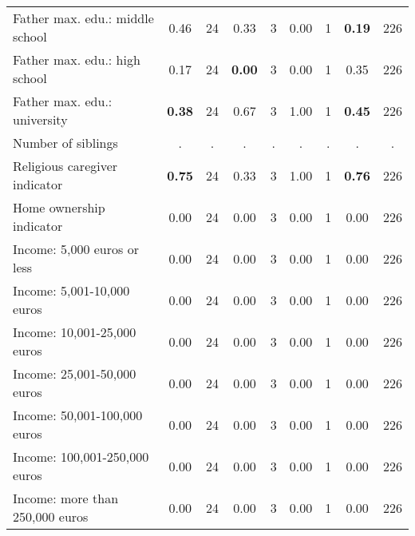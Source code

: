 \begin{tabular}{l c c c c c c c c}
Father max. edu.: middle school &      0.46 &        24 &      0.33 &         3 &      0.00 &         1 & \textbf{     0.19} &       226 \\
Father max. edu.: high school &      0.17 &        24 & \textbf{     0.00} &         3 &      0.00 &         1 &      0.35 &       226 \\
Father max. edu.: university & \textbf{     0.38} &        24 &      0.67 &         3 &      1.00 &         1 & \textbf{     0.45} &       226 \\
Number of siblings &         . & . &         . & . &         . & . &         . & . \\
Religious caregiver indicator & \textbf{     0.75} &        24 &      0.33 &         3 &      1.00 &         1 & \textbf{     0.76} &       226 \\
Home ownership indicator &      0.00 &        24 &      0.00 &         3 &      0.00 &         1 &      0.00 &       226 \\
Income: 5,000 euros or less &      0.00 &        24 &      0.00 &         3 &      0.00 &         1 &      0.00 &       226 \\
Income: 5,001-10,000 euros &      0.00 &        24 &      0.00 &         3 &      0.00 &         1 &      0.00 &       226 \\
Income: 10,001-25,000 euros &      0.00 &        24 &      0.00 &         3 &      0.00 &         1 &      0.00 &       226 \\
Income: 25,001-50,000 euros &      0.00 &        24 &      0.00 &         3 &      0.00 &         1 &      0.00 &       226 \\
Income: 50,001-100,000 euros &      0.00 &        24 &      0.00 &         3 &      0.00 &         1 &      0.00 &       226 \\
Income: 100,001-250,000 euros &      0.00 &        24 &      0.00 &         3 &      0.00 &         1 &      0.00 &       226 \\
Income: more than 250,000 euros &      0.00 &        24 &      0.00 &         3 &      0.00 &         1 &      0.00 &       226 \\
\bottomrule
\end{tabular}
